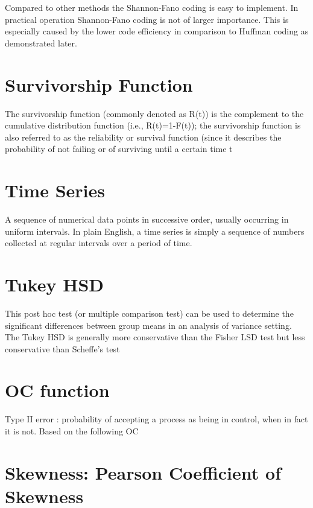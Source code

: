 \begin{enumerate}
Compared to other methods the Shannon-Fano coding is easy to implement. In practical operation Shannon-Fano coding is not of larger importance. This is especially caused by the lower code efficiency in comparison to Huffman coding as demonstrated later.




\section{Survivorship Function}
The survivorship function (commonly denoted as R(t)) is the complement to the cumulative distribution function
(i.e., R(t)=1-F(t)); the survivorship function is also referred to as the reliability or survival function (since it describes the probability of not failing or of surviving until a certain time t
\section{Time Series}

A sequence of numerical data points in successive order, usually occurring in uniform intervals. In plain English, a time series is simply a sequence of numbers collected at regular intervals over a period of time.





\section{Tukey HSD}

This post hoc test (or multiple comparison test) can be used to determine the significant differences between group means in an analysis of variance setting. The Tukey HSD is generally more conservative than the Fisher LSD test but less conservative than Scheffe's test





\section{OC function}
Type II error : probability of accepting a process as being in control, when in fact it is not.
Based on the following OC



\section{Skewness: Pearson Coefficient of Skewness}


\end{enumerate}
